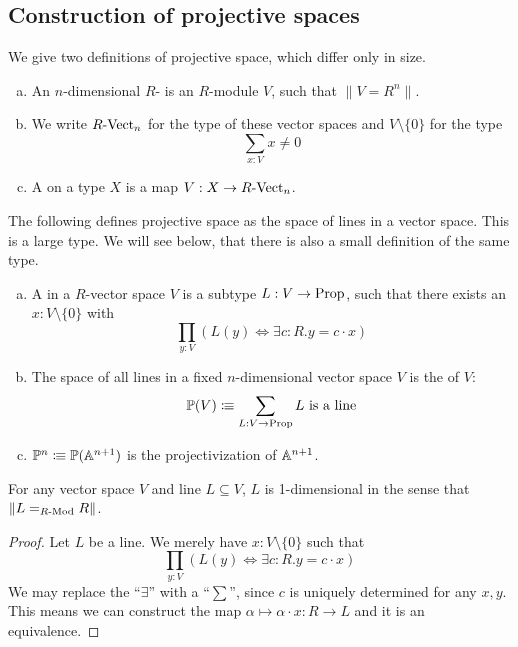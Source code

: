 
\subsection{Construction of projective spaces}
We give two definitions of projective space, which differ only in size.

\begin{definition}%
  \begin{enumerate}[(a)]
  \item An $n$-dimensional $R$- is an $R$-module $V$,
    such that $\| V = R^n \|$. 
  \item We write $R\text{-}\mathrm{Vect}_{n}$ for the type of these vector spaces and $V\setminus\{0\}$ for the type
    \[ \sum_{x:V}x\neq 0\]
  \item A  on a type $X$ is a map $V:X\to R\text{-}\mathrm{Vect}_{n}$. 
  \end{enumerate}
\end{definition}

The following defines projective space as the space of lines in a vector space.
This is a large type.
We will see below, that there is also a small definition of the same type.

\begin{definition}%
  \begin{enumerate}[(a)]
  \item   A  in a $R$-vector space $V$ is a subtype $L:V\to \mathrm{Prop}$,
    such that there exists an $x:V\setminus\{0\}$ with
    \[ \prod_{y:V}\left(L (y) \Leftrightarrow \exists c:R.y=c\cdot x\right)\]
  \item The space of all lines in a fixed $n$-dimensional vector space $V$ is the  of $V$:
    \[ \mathbb{P}(V)\vcentcolon\mspace{-1.2mu}\equiv \sum_{L:V\to \mathrm{Prop}} L \text{ is a line}  \]
  \item {} $\mathbb{P}^n \vcentcolon\mspace{-1.2mu}\equiv \mathbb{P}(\mathbb{A}^{n+1})$ is the projectivization of $\mathbb{A}^{n+1}$.
  \end{enumerate}
\end{definition}

\begin{proposition}%
  \label{lines-are-one-dimensional}
  For any vector space $V$ and line $L\subseteq V$,
  $L$ is 1-dimensional in the sense that $\|L=_{R\text{-}\mathrm{Mod}}R\|$.
\end{proposition}

\begin{proof}
  Let $L$ be a line.
  We merely have $x:V\setminus\{0\}$ such that 
  \[ \prod_{y:V}\left(L (y) \Leftrightarrow \exists c:R.y=c\cdot x\right)\]
  We may replace the ``$\exists$'' with a ``$\sum$'',
  since $c$ is uniquely determined for any $x,y$.
  This means we can construct the map $\alpha\mapsto \alpha\cdot x:R\to L$ and it is an equivalence.
\end{proof}

